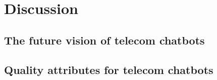 \section{Discussion}

\subsection{The future vision of telecom chatbots}

\subsection{Quality attributes for telecom chatbots}
